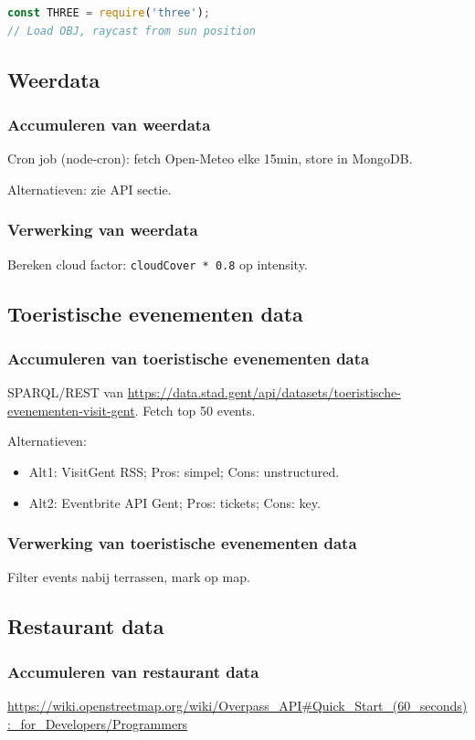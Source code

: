\documentclass{article}
\begin{document}
\begin{lstlisting}[language=JavaScript]
const THREE = require('three');
// Load OBJ, raycast from sun position
\end{lstlisting}

\subsection{Weerdata}
\subsubsection{Accumuleren van weerdata}
Cron job (node-cron): fetch Open-Meteo elke 15min, store in MongoDB.

Alternatieven: zie API sectie.

\subsubsection{Verwerking van weerdata}
Bereken cloud factor: \texttt{cloudCover * 0.8} op intensity.

\subsection{Toeristische evenementen data}
\subsubsection{Accumuleren van toeristische evenementen data}
SPARQL/REST van \url{https://data.stad.gent/api/datasets/toeristische-evenementen-visit-gent}\cite{web:7}. Fetch top 50 events.

Alternatieven:
\begin{itemize}
    \item Alt1: VisitGent RSS; Pros: simpel; Cons: unstructured.
    \item Alt2: Eventbrite API Gent; Pros: tickets; Cons: key.
\end{itemize}

\subsubsection{Verwerking van toeristische evenementen data}
Filter events nabij terrassen, mark op map.

\subsection{Restaurant data}
\subsubsection{Accumuleren van restaurant data}
\url{https://wiki.openstreetmap.org/wiki/Overpass_API#Quick_Start_(60_seconds):_for_Developers/Programmers}
\end{document}
